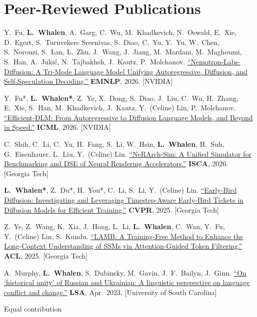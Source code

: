 \documentclass[10pt,a4paper]{article}
\begin{document}
\section{Peer-Reviewed Publications}
\begin{publist}
  \item Y.\ Fu, \textbf{L.\ Whalen}, A.\ Garg, C.\ Wu, M.\ Khadkevich, N.\ Oswald, E.\ Xie, D.\ Egert, S.\ Turuvekere Sreenivas, S.\ Diao, C.\ Yu, Y.\ Yu, W.\ Chen, S.\ Norouzi, S.\ Lan, L.\ Zhu, J.\ Wang, J.\ Jiang, M.\ Mardani, M.\ Maghoumi, S.\ Han, A.\ Juki\'{c}, N.\ Tajbakhsh, J.\ Kautz, P.\ Molchanov. \href{https://arxiv.org/pdf/2607.05722}{``Nemotron-Labs-Diffusion: A Tri-Mode Language Model Unifying Autoregressive, Diffusion, and Self-Speculation Decoding.''} \textbf{EMNLP}, 2026. [NVIDIA]

  \item Y.\ Fu*, \textbf{L.\ Whalen*}, Z.\ Ye, X.\ Dong, S.\ Diao, J.\ Liu, C.\ Wu, H.\ Zhang, E.\ Xie, S.\ Han, M.\ Khadkevich, J.\ Kautz, Y.\ (Celine) Lin, P.\ Molchanov. \href{https://arxiv.org/pdf/2512.14067}{``Efficient-DLM: From Autoregressive to Diffusion Language Models, and Beyond in Speed.''} \textbf{ICML}, 2026. [NVIDIA]

  \item C.\ Shih, C.\ Li, C.\ Yu, H.\ Fang, S.\ Li, W.\ Hsin, \textbf{L.\ Whalen}, H.\ Suh, G.\ Eisenhauer, L.\ Liu, Y.\ (Celine) Lin. \href{https://ieeexplore.ieee.org/abstract/document/11617858}{``NeRArch-Sim: A Unified Simulator for Benchmarking and DSE of Neural Rendering Accelerators.''} \textbf{ISCA}, 2026. [Georgia Tech]

  \item \textbf{L.\ Whalen*}, Z.\ Du*, H.\ You*, C.\ Li, S.\ Li, Y.\ (Celine) Lin. \href{https://openaccess.thecvf.com/content/CVPR2025/html/Whalen_Early-Bird_Diffusion_Investigating_and_Leveraging_Timestep-Aware_Early-Bird_Tickets_in_Diffusion_CVPR_2025_paper.html}{``Early-Bird Diffusion: Investigating and Leveraging Timestep-Aware Early-Bird Tickets in Diffusion Models for Efficient Training.''} \textbf{CVPR}, 2025. [Georgia Tech]

  \item Z.\ Ye, Z.\ Wang, K.\ Xia, J.\ Hong, L.\ Li, \textbf{L.\ Whalen}, C.\ Wan, Y.\ Fu, Y.\ (Celine) Lin, S.\ Kundu. \href{https://aclanthology.org/2025.acl-short.96.pdf}{``LAMB: A Training-Free Method to Enhance the Long-Context Understanding of SSMs via Attention-Guided Token Filtering.''} \textbf{ACL}, 2025. [Georgia Tech]

  \item A.\ Murphy, \textbf{L.\ Whalen}, S.\ Dubinsky, M.\ Gavin, J.\ F.\ Bailyn, J.\ Ginn. \href{https://journals.linguisticsociety.org/proceedings/index.php/PLSA/article/view/5467}{``On `historical unity' of Russian and Ukrainian: A linguistic perspective on language conflict and change.''} \textbf{LSA}, Apr.\ 2023. [University of South Carolina]
\end{publist}
{\footnotesize * Equal contribution}
\end{document}
